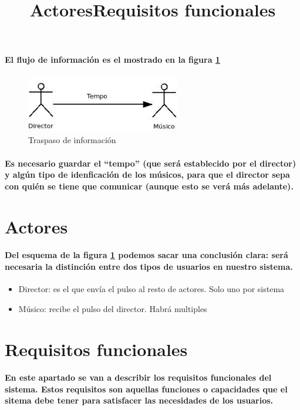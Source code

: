 \paragraph{
El flujo de información es el mostrado en la figura \ref{fig:mensajesconceptual}
}
  \begin{figure}[htb]
  \centering
  \includegraphics[width=0.6\textwidth]{./imagenes/mensajesconceptual}
  \caption{Traspaso de información} \label{fig:mensajesconceptual}
  \end{figure}


\paragraph{
Es necesario guardar el ``tempo'' (que será establecido por el director) y algún tipo
de idenficación de los músicos, para que el director sepa con quién se tiene que
comunicar (aunque esto se verá más adelante).
}

\title{Actores}
\section{Actores}

\paragraph{
Del esquema de la figura \ref{fig:mensajesconceptual} podemos sacar una conclusión clara:
será necesaria la distinción entre dos tipos de usuarios en nuestro sistema.
}
  \begin{itemize}
    \item Director: es el que envía el pulso al resto de actores. Solo uno por sistema
    \item Músico: recibe el pulso del director. Habrá multiples
  \end{itemize}


\title{Requisitos funcionales}
\section{Requisitos funcionales}

\paragraph{
En este apartado se van a describir los requisitos funcionales del sistema.
Estos requisitos son aquellas funciones o capacidades que el sitema debe
tener para satisfacer las necesidades de los usuarios.
}

